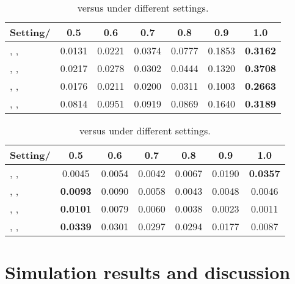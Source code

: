 \documentclass[10pt,peerreview,draftcls,onecolumn]{IEEEtran}
\begin{document}
\begin{table*}[t!]
\small
\centering
\renewcommand{\arraystretch}{1.1}
\begin{tabular}{c| c c c c c c|}
\hline
\multicolumn{1}{|c|}{Setting/} & 0.5   & 0.6   & 0.7   & 0.8   &0.9   &1.0   \\ \hline
\multicolumn{1}{|l|}{, , }  &0.0131 &0.0221 &0.0374	&0.0777	&0.1853 &{\bf 0.3162}\\ \hline
\multicolumn{1}{|l|}{, , } &0.0217 &0.0278 &0.0302	&0.0444	&0.1320 &{\bf 0.3708}\\ \hline
\multicolumn{1}{|l|}{, , }  & 0.0176 &0.0211 &0.0200 &0.0311 &0.1003 &{\bf 0.2663}\\ \hline
\multicolumn{1}{|l|}{, , } &0.0814 &0.0951 &0.0919 &0.0869 &0.1640 &{\bf 0.3189}\\\hline
\end{tabular}

\caption{ versus  under different settings.}
\label{tab.ProbTable}
\end{table*}

\begin{table*}[t!]
\small
\centering
\renewcommand{\arraystretch}{1.1}

\begin{tabular}{c| c c c c c c|}
\hline
\multicolumn{1}{|c|}{Setting/} &0.5   &0.6   &0.7   &0.8   &0.9   &1.0   \\ \hline
\multicolumn{1}{|l|}{, , }  &0.0045  &0.0054  &0.0042  &0.0067  &0.0190  &{\bf 0.0357}\\ \hline
\multicolumn{1}{|l|}{, , } &{\bf 0.0093} &0.0090  &0.0058  &0.0043  &0.0048  &0.0046\\ \hline
\multicolumn{1}{|l|}{, , }  &{\bf 0.0101}  &0.0079  &0.0060  &0.0038  &0.0023  &0.0011\\ \hline
\multicolumn{1}{|l|}{, , } &{\bf 0.0339}  &0.0301  &0.0297  &0.0294  &0.0177  &0.0087\\ \hline
\end{tabular}
\caption{ versus  under different settings.}
\label{tab.DetTable}
\end{table*}

\section{Simulation results and discussion}
\label{sec.simul}
\end{document}

